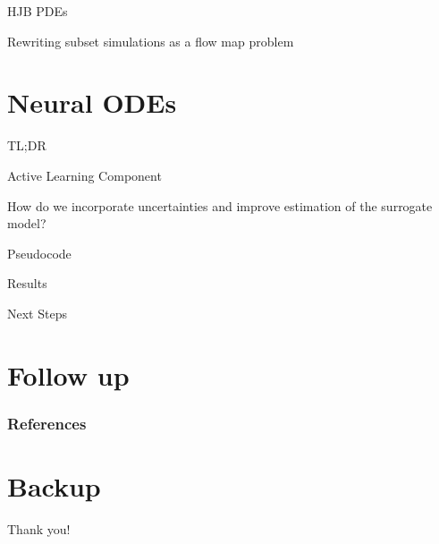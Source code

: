 \documentclass[usenames,dvipsnames]{beamer}
\theoremstyle{definition}
\begin{document}
\begin{frame}{HJB PDEs}
    
\end{frame}

\begin{frame}{Rewriting subset simulations as a flow map problem}

\end{frame}

\section{Neural ODEs}
\begin{frame}{TL;DR}

\end{frame}

\begin{frame}{Active Learning Component}

How do we incorporate uncertainties and improve estimation of the surrogate model?

\end{frame}

\begin{frame}{Pseudocode}

\end{frame}

\begin{frame}{Results}

\end{frame}

\begin{frame}{Next Steps}

\end{frame}

\section{Follow up}

\begin{frame}[allowframebreaks]
    \frametitle{References}
    

    
\end{frame}

\section{Backup}
\begin{frame}{}
\begin{center}
    \Large{Thank you!}
\end{center}
        
\end{frame}


\end{document}
